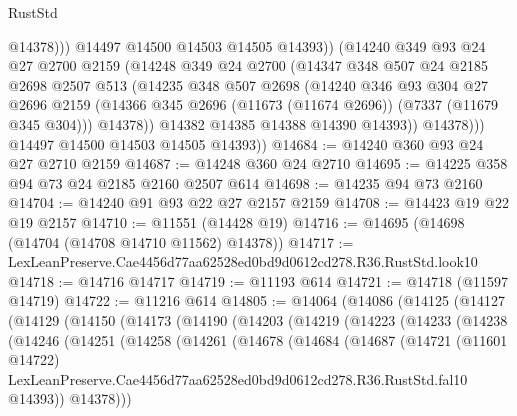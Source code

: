 \begin{lexlean}{RustStd}
\begin{coremodule}
                      @14378)))
                @14497
                @14500
                @14503
                @14505
                @14393))
            (@14240
              @349
              @93
              @24
              @27
              @2700
              @2159
              (@14248
                @349
                @24
                @2700
                (@14347
                  @348
                  @507
                  @24
                  @2185
                  @2698
                  @2507
                  @513
                  (@14235
                    @348
                    @507
                    @2698
                    (@14240
                      @346
                      @93
                      @304
                      @27
                      @2696
                      @2159
                      (@14366 @345 @2696 (@11673 (@11674 @2696)) (@7337 (@11679 @345 @304)))
                      @14378))
                  @14382
                  @14385
                  @14388
                  @14390
                  @14393))
              @14378)))
        @14497
        @14500
        @14503
        @14505
        @14393))
@14684 := @14240 @360 @93 @24 @27 @2710 @2159
@14687 := @14248 @360 @24 @2710
@14695 := @14225 @358 @94 @73 @24 @2185 @2160 @2507 @614
@14698 := @14235 @94 @73 @2160
@14704 := @14240 @91 @93 @22 @27 @2157 @2159
@14708 := @14423 @19 @22 @19 @2157
@14710 := @11551 (@14428 @19)
@14716 := @14695 (@14698 (@14704 (@14708 @14710 @11562) @14378))
@14717 := LexLeanPreserve.Cae4456d77aa62528ed0bd9d0612cd278.R36.RustStd.look10
@14718 := @14716 @14717
@14719 := @11193 @614
@14721 := @14718 (@11597 @14719)
@14722 := @11216 @614
@14805 := @14064
    (@14086
      (@14125
        (@14127
          (@14129
            (@14150
              (@14173
                (@14190
                  (@14203
                    (@14219
                      (@14223
                        (@14233
                          (@14238
                            (@14246
                              (@14251
                                (@14258
                                  (@14261
                                    (@14678
                                      (@14684
                                        (@14687
                                          (@14721
                                            (@11601 @14722)
                                            LexLeanPreserve.Cae4456d77aa62528ed0bd9d0612cd278.R36.RustStd.fal10
                                            @14393))
                                        @14378)))

\end{coremodule}
\end{lexlean}

